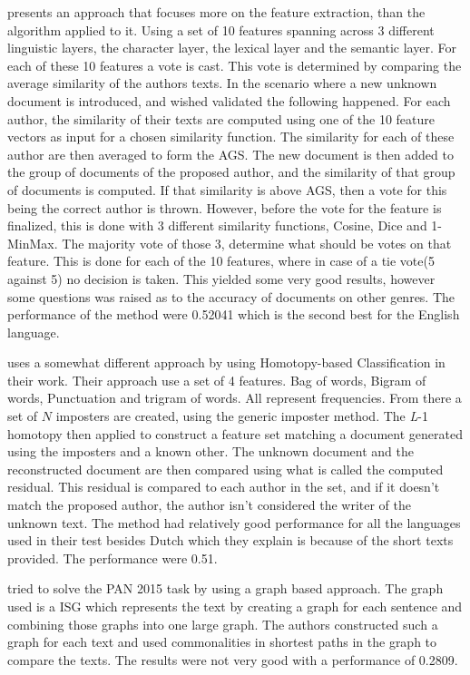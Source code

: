 \cite{castro2015Paper} presents an approach that focuses more on the feature
extraction, than the algorithm applied to it. Using a set of 10 features
spanning across 3 different linguistic layers, the character layer, the lexical
layer and the semantic layer. For each of these 10 features a vote is cast. This
vote is determined by comparing the average similarity of the authors texts. In
the scenario where a new unknown document is introduced, and wished validated
the following happened. For each author, the similarity of their texts are
computed using one of the 10 feature vectors as input for a chosen similarity
function. The similarity for each of these author are then averaged to form
the \gls{AGS}. The new document is then added to the group of documents of the
proposed author, and the similarity of that group of documents is computed.
If that similarity is above \gls{AGS}, then a vote for this being the correct
author is thrown. However, before the vote for the feature is finalized, this
is done with 3 different similarity functions, Cosine, Dice and 1-MinMax. The
majority vote of those 3, determine what should be votes on that feature. This
is done for each of the 10 features, where in case of a tie vote(5 against 5) no
decision is taken. This yielded some very good results, however some questions
was raised as to the accuracy of documents on other genres. The performance of
the method were 0.52041 which is the second best for the English language.

\cite{gutierrez2015} uses a somewhat different approach by using Homotopy-based
Classification in their work. Their approach use a set of 4 features. Bag
of words, Bigram of words, Punctuation and trigram of words. All represent
frequencies. From there a set of $N$ imposters are created, using the generic
imposter method. The \textit{L}-1 homotopy then applied to construct a feature
set matching a document generated using the imposters and a known other. The
unknown document and the reconstructed document are then compared using what is
called the computed residual. This residual is compared to each author in the
set, and if it doesn't match the proposed author, the author isn't considered
the writer of the unknown text. The method had relatively good performance
for all the languages used in their test besides Dutch which they explain is
because of the short texts provided. The performance were 0.51.

\cite{gomezadorno2015} tried to solve the PAN 2015 task by using a graph based
approach. The graph used is a \gls{ISG} which represents the text by creating a
graph for each sentence and combining those graphs into one large graph. The
authors constructed such a graph for each text and used commonalities in
shortest paths in the graph to compare the texts. The results were not very
good with a performance of 0.2809.

